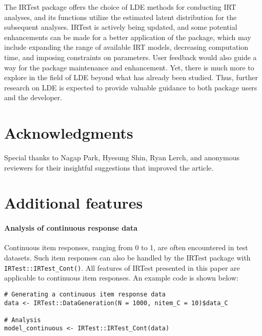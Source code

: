 The IRTest package offers the choice of LDE methods for conducting IRT
analyses, and its functions utilize the estimated latent distribution
for the subsequent analyses. IRTest is actively being updated, and some
potential enhancements can be made for a better application of the
package, which may include expanding the range of available IRT models,
decreasing computation time, and imposing constraints on parameters.
User feedback would also guide a way for the package maintenance and
enhancement. Yet, there is much more to explore in the field of LDE
beyond what has already been studied. Thus, further research on LDE is
expected to provide valuable guidance to both package users and the
developer.

\hypertarget{acknowledgments}{%
\section*{Acknowledgments}\label{acknowledgments}}

Special thanks to Nagap Park, Hyesung Shin, Ryan Lerch, and anonymous
reviewers for their insightful suggestions that improved the article.

\hypertarget{additional-features}{%
\section*{Additional features}\label{additional-features}}

\hypertarget{analysis-of-continuous-response-data}{%
\paragraph*{Analysis of continuous response data}\label{analysis-of-continuous-response-data}}

Continuous item responses, ranging from 0 to 1, are often encountered in
test datasets. Such item responses can also be handled by the IRTest
package with \texttt{IRTest::IRTest\_Cont()}. All features of IRTest presented
in this paper are applicable to continuous item responses. An example
code is shown below:

\begin{verbatim}
# Generating a continuous item response data
data <- IRTest::DataGeneration(N = 1000, nitem_C = 10)$data_C

# Analysis
model_continuous <- IRTest::IRTest_Cont(data)
\end{verbatim}

